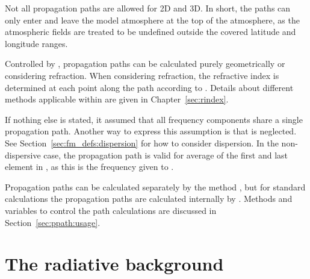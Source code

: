 Not all propagation paths are allowed for 2D and 3D. In short, the paths can
only enter and leave the model atmosphere at the top of the atmosphere, as the
atmospheric fields are treated to be undefined outside the covered latitude and
longitude ranges.

Controlled by , propagation paths can be
calculated purely geometrically or considering refraction. When considering
refraction, the refractive index is determined at each point along the path
according to . Details about different
methods applicable within  are given in
Chapter~\ref{sec:rindex}.

If nothing else is stated, it assumed that all frequency components share a
single propagation path. Another way to express this assumption is that
 is neglected. See Section~\ref{sec:fm_defs:dispersion}
for how to consider dispersion. In the non-dispersive case, the propagation
path is valid for average of the first and last element in ,
as this is the frequency given to .

Propagation paths can be calculated separately by the method
, but for standard calculations the propagation paths are
calculated internally by . Methods and variables to control
the path calculations are discussed in Section~\ref{sec:ppath:usage}. 



\section{The radiative background}
\label{sec:fm_defs:rad_bkgr}


